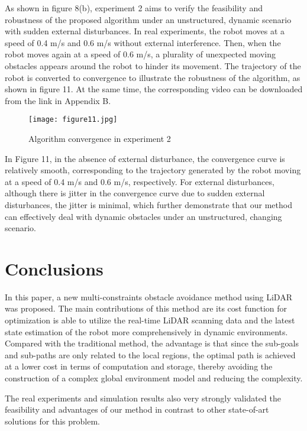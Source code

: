 \documentclass{iosart2c}
\begin{document}
As shown in figure 8(b), experiment 2 aims to verify the feasibility and robustness of the proposed algorithm under an unstructured, dynamic scenario with sudden external disturbances. In real experiments, the robot moves at a speed of 0.4 m/s and 0.6 m/s without external interference. Then, when the robot moves again at a speed of 0.6 m/s, a plurality of unexpected moving obstacles appears around the robot to hinder its movement. The trajectory of the robot is converted to convergence to illustrate the robustness of the algorithm, as shown in figure 11. At the same time, the corresponding video can be downloaded from the link in Appendix B.
\begin{figure}[htbp] %
\hspace{-0.2cm}
\setlength{\abovecaptionskip}{0.1cm}  %
\texttt{[image: figure11.jpg]}
\caption{Algorithm convergence in experiment 2}\label{f11}
\end{figure}

In Figure 11, in the absence of external disturbance, the convergence curve is relatively smooth, corresponding to the trajectory generated by the robot moving at a speed of 0.4 m/s and 0.6 m/s, respectively. For external disturbances, although there is jitter in the convergence curve due to sudden external disturbances, the jitter is minimal, which further demonstrate that our method can effectively deal with dynamic obstacles under an unstructured, changing scenario. 

\section{Conclusions }\label{s5}
In this paper, a new multi-constraints obstacle avoidance method using LiDAR was proposed. The main contributions of this method are its cost function for optimization is able to utilize the real-time LiDAR scanning data and the latest state estimation of the robot more comprehensively in dynamic environments. Compared with the traditional method, the advantage is that since the sub-goals and sub-paths are only related to the local regions, the optimal path is achieved at a lower cost in terms of computation and storage, thereby avoiding the construction of a complex global environment model and reducing the complexity.

The real experiments and simulation results also very strongly validated the feasibility and advantages of our method in contrast to other state-of-art solutions for this problem. 
\end{document}
